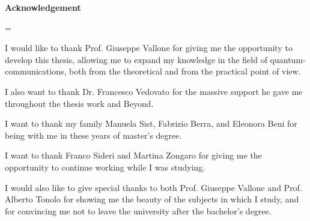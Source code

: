 \cleardoublepage
\thispagestyle{empty}
\vspace*{\fill}
\centerline{\large\bfseries Acknowledgement}
\nobreak
\vspace{1pc}
\begingroup\small
{}\textwidth
\rightskip=\leftskip

I would like to thank Prof. Giuseppe Vallone for giving me the opportunity to develop this thesis, allowing me to expand my knowledge in the field of quantum-communications, both from the theoretical and from the practical point of view.

I also want to thank Dr. Francesco Vedovato for the massive support he gave me throughout the thesis work and Beyond.

I want to thank my family Manuela Sist, Fabrizio Berra, and Eleonora Beni for being with me in these years of master’s degree.

I want to thank Franco Sideri and Martina Zongaro for giving me the opportunity to continue working while I was studying.

I would also like to give special thanks to both Prof. Giuseppe Vallone and Prof. Alberto Tonolo for showing me the beauty of the subjects in which I study, and for convincing me not to leave the university after the bachelor's degree.


\par\endgroup
\vspace{\fill}
\clearpage
